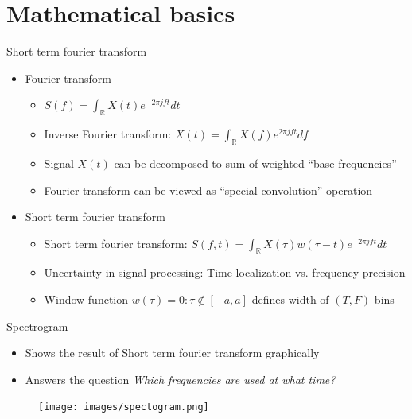 \documentclass[xcolor=table,mathserif,9pt]{beamer}    %
\begin{document}
\section{Mathematical basics}%
\label{sec:mathematical_basics}
\begin{frame}{Short term fourier transform}

\begin{itemize}
	\setlength\itemsep{1em}
	\item Fourier transform 
	\begin{itemize}
		\item $S(f) = \int_{\mathbb{R}}X(t)e^{-2{\pi}jft}dt$
		\item Inverse Fourier transform: $X(t) = \int_{\mathbb{R}}X(f)e^{2{\pi}jft}df$
		\item Signal $X(t)$ can be decomposed to sum of weighted ``base frequencies''
		\item Fourier transform can be viewed as ``special convolution'' operation
	\end{itemize}
	\item Short term fourier transform
	\begin{itemize}
		\item Short term fourier transform: $S(f,t) = \int_{\mathbb{R}}X(\tau)w(\tau - t)e^{-2{\pi}jft}dt$ 
		\item Uncertainty in signal processing: Time localization vs. frequency precision
		\item Window function $w(\tau) = 0: \tau \not \in \left[-a, a \right]$ defines width of $(T,F)$ bins 
	\end{itemize}
\end{itemize}


\end{frame}

\begin{frame}{Spectrogram}

\begin{itemize}
	\item Shows the result of Short term fourier transform graphically
	\item Answers the question \emph{Which frequencies are used at what time?}
\end{itemize}

\begin{center}
	\begin{figure}
		\texttt{[image: images/spectogram.png]}
	\end{figure}
\end{center}

\end{frame}
\end{document}
